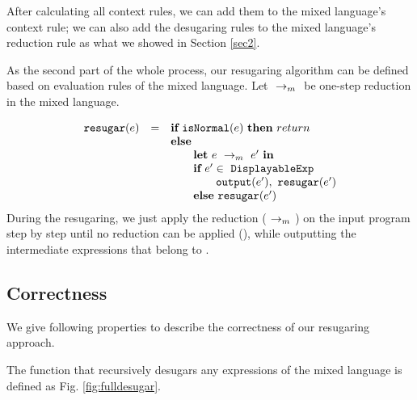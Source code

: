 After calculating all context rules, we can add them to the mixed language's context rule; we can also add the desugaring rules to the mixed language's reduction rule as what we showed in Section \ref{sec2}.


As the second part of the whole process, our resugaring algorithm can be defined based on evaluation rules of the mixed language. Let $~\rightarrow_m~$ be one-step reduction in the mixed language.

\[
\begin{array}{llll}
\mbox{\tt resugar} (e) &=& \mbox{\rm \bf if}~\mbox{\tt isNormal}(e)~\mbox{\rm \bf then}~return\\
              & & \mbox{\rm \bf else}~\\
							& & \qquad \mbox{\rm \bf let}~e ~\rightarrow_m~e'~\mbox{\rm \bf in}\\
							& & \qquad \mbox{\rm \bf if}~e' \in~\mbox{\tt DisplayableExp} \\
							& & \qquad \qquad \mbox{\tt output}(e'),~\mbox{\tt resugar}(e')\\
							& & \qquad \mbox{\rm \bf else}~\mbox{\tt resugar}(e')
\end{array}
\]
During the resugaring, we just apply the reduction ($~\rightarrow_m~$) on the input program step by step until no reduction can be applied (), while outputting the intermediate expressions that belong to .


\subsection{Correctness}
\label{mark:correct}

We give following properties to describe the correctness of our resugaring approach.
\begin{Def} The function that recursively desugars any expressions of the mixed language is defined as Fig.  \ref{fig:fulldesugar}.\end{Def}

